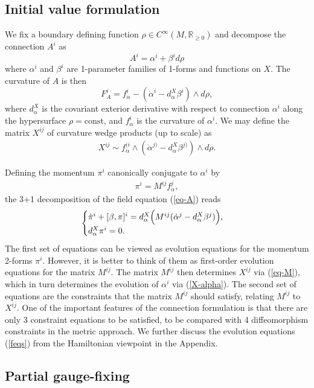 \documentclass[a4paper,12pt]{article}
\newcommand{\R}{{\mathbb R}}
\newcommand{\be}{\begin{eqnarray}}
\newcommand{\ee}{\end{eqnarray}}
\begin{document}
\subsection{Initial value formulation}
\label{subsec: Init val form}

We fix a boundary defining function $\rho\in C^\infty(M,\R_{\geq 0})$ and decompose the connection $A^i$ as
$$A^i=\alpha^i+\beta^id\rho$$
where $\alpha^i$ and $\beta^i$ are 1-parameter families of 1-forms and functions on $X$. The curvature of $A$ is then
$$F_A^i=f_\alpha^i-(\dot\alpha^i-d^X_\alpha\beta^i)\wedge d\rho,$$
where $d^X_\alpha$ is the covariant exterior derivative with respect to connection $\alpha^i$ along the hypersurface $\rho=\text{const}$, and $f^i_\alpha$ is the curvature of $\alpha^i$. We may define the matrix $X^{ij}$ of curvature wedge products (up to scale) as
\be\label{X-alpha}
X^{ij} \sim f_\alpha^{(i}\wedge (\dot\alpha^{j)}-d^X_\alpha\beta^{j)})\wedge d\rho.
\ee

Defining the momentum $\pi^i$ canonically conjugate to $\alpha^i$ by
\be\label{pi}
\pi^i = M^{ij} f^j_\alpha,
\ee
the 3+1 decomposition of the field equation (\ref{eq-A}) reads
\be\label{feqs}
\begin{cases}
\dot\pi^i+[\beta,\pi]^i=d^X_\alpha\Big(M^{ij}(\dot\alpha^j-d^X_\alpha\beta^j)\Big),
\cr
d^X_\alpha \pi^i=0.
\end{cases}
\ee
The first set of equations can be viewed as evolution equations for the momentum 2-forms $\pi^i$. However, it is better to think of them as first-order evolution equations for the matrix $M^{ij}$. The matrix $M^{ij}$ then determines $X^{ij}$ via (\ref{eq-M}), which in turn determines the evolution of $\alpha^i$ via (\ref{X-alpha}). The second set of equations are the constraints that the matrix $M^{ij}$ should satisfy, relating $M^{ij}$ to $X^{ij}$. One of the important features of the connection formulation is that there are only 3 constraint equations to be satisfied, to be compared with 4 diffeomorphism constraints in the metric approach. We further discuss the evolution equations (\ref{feqs}) from the Hamiltonian viewpoint in the Appendix. 

\subsection{Partial gauge-fixing}
\end{document}
